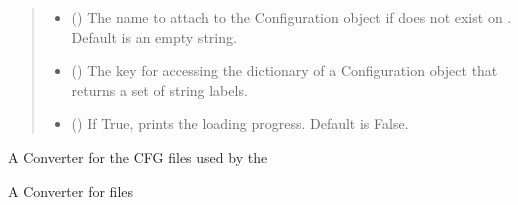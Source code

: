 \documentclass[letterpaper,10pt,english]{sphinxmanual}
\begin{document}
\begin{fulllineitems}
\begin{fulllineitems}
\begin{quote}
\begin{description}
\begin{itemize}
\item {} 
\sphinxAtStartPar
{} () \textendash{} The name to attach to the Configuration object if 
does not exist on . Default is an
empty string.

\item {} 
\sphinxAtStartPar
{} () \textendash{} The key for accessing the  dictionary of a
Configuration object that returns a set of string labels.

\item {} 
\sphinxAtStartPar
{} () \textendash{} If True, prints the loading progress. Default is False.

\end{itemize}

\end{description}\end{quote}

\end{fulllineitems}


\end{fulllineitems}


\begin{fulllineitems}
\label{\detokenize{converters:colabfit.tools.converters.CFGConverter}}
\sphinxAtStartPar
A Converter for the CFG files used by the 

\end{fulllineitems}


\begin{fulllineitems}
\label{\detokenize{converters:colabfit.tools.converters.EXYZConverter}}
\sphinxAtStartPar
A Converter for  files

\end{fulllineitems}
\end{document}

